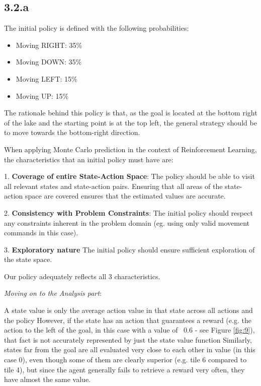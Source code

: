 \documentclass{article} %
\begin{document}
	\subsection{3.2.a}
	
	The initial policy is defined with the following probabilities:
	\begin{itemize}
		\item Moving RIGHT: 35\%
		\item Moving DOWN: 35\%
		\item Moving LEFT: 15\%
		\item Moving UP: 15\%
	\end{itemize}
	
	The rationale behind this policy is that, as the goal is located at the bottom right of the lake and the starting point is at the top left, the general strategy should be to move towards the bottom-right direction.
	
	When applying Monte Carlo prediction in the context of Reinforcement Learning, the characteristics that an initial policy must have are:
	
	1. \textbf{Coverage of entire State-Action Space}: The policy should be able to visit all relevant states and state-action pairs. Ensuring that all areas of the state-action space are covered ensures that the estimated values are accurate.
	
	2. \textbf{Consistency with Problem Constraints}: The initial policy should respect any constraints inherent in the problem domain (eg. using only valid movement commands in this case). 
	
	3. \textbf{Exploratory nature} The initial policy should ensure sufficient exploration of the state space.
	
	Our policy  adequately reflects all 3 characteristics. 
	\newline
	
	
	
	\textit{Moving on to the Analysis part}:
		
	A state value is only the average action value in that state across all actions and the policy
	However, if the state has an action that guarantees a reward (e.g. the action to the left of the goal, 
	in this case with a value of ~0.6 - see Figure \ref{fig:9}), that fact is not accurately represented by just the state value function
	Similarly, states far from the goal are all evaluated very close to each other in value (in this case 0),
	even though some of them are clearly superior (e.g. tile 6 compared to tile 4), but since the agent generally
	fails to retrieve a reward very often, they have almost the same value.
	
\end{document}
